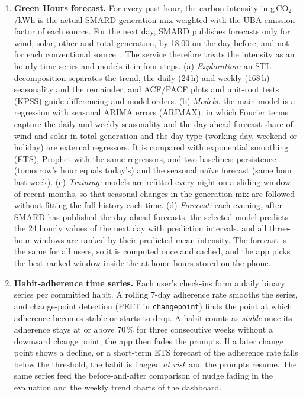 \documentclass[conference]{IEEEtran}
\newcommand{\COtwo}{CO$_2$}
\newcommand{\pkg}[1]{\texttt{#1}}
\begin{document}
\begin{enumerate}
\item \textbf{Green Hours forecast.} For every past hour, the carbon intensity in g\,\COtwo/kWh is the actual SMARD generation mix weighted with the UBA emission factor of each source. For the next day, SMARD publishes forecasts only for wind, solar, other and total generation, by 18:00 on the day before, and not for each conventional source~\cite{smard}. The service therefore treats the intensity as an hourly time series and models it in four steps. (a) \emph{Exploration:} an STL decomposition separates the trend, the daily (24\,h) and weekly (168\,h) seasonality and the remainder, and ACF/PACF plots and unit-root tests (KPSS) guide differencing and model orders. (b) \emph{Models:} the main model is a regression with seasonal ARIMA errors (ARIMAX), in which Fourier terms capture the daily and weekly seasonality and the day-ahead forecast share of wind and solar in total generation and the day type (working day, weekend or holiday) are external regressors. It is compared with exponential smoothing (ETS), Prophet with the same regressors, and two baselines: persistence (tomorrow's hour equals today's) and the seasonal na\"ive forecast (same hour last week). (c) \emph{Training:} models are refitted every night on a sliding window of recent months, so that seasonal changes in the generation mix are followed without fitting the full history each time. (d) \emph{Forecast:} each evening, after SMARD has published the day-ahead forecasts, the selected model predicts the 24 hourly values of the next day with prediction intervals, and all three-hour windows are ranked by their predicted mean intensity. The forecast is the same for all users, so it is computed once and cached, and the app picks the best-ranked window inside the at-home hours stored on the phone.
\item \textbf{Habit-adherence time series.} Each user's check-ins form a daily binary series per committed habit. A rolling 7-day adherence rate smooths the series, and change-point detection (PELT in \pkg{changepoint}) finds the point at which adherence becomes stable or starts to drop. A habit counts as \emph{stable} once its adherence stays at or above 70\,\% for three consecutive weeks without a downward change point; the app then fades the prompts. If a later change point shows a decline, or a short-term ETS forecast of the adherence rate falls below the threshold, the habit is flagged \emph{at risk} and the prompts resume. The same series feed the before-and-after comparison of nudge fading in the evaluation and the weekly trend charts of the dashboard.

\end{enumerate}
\end{document}
